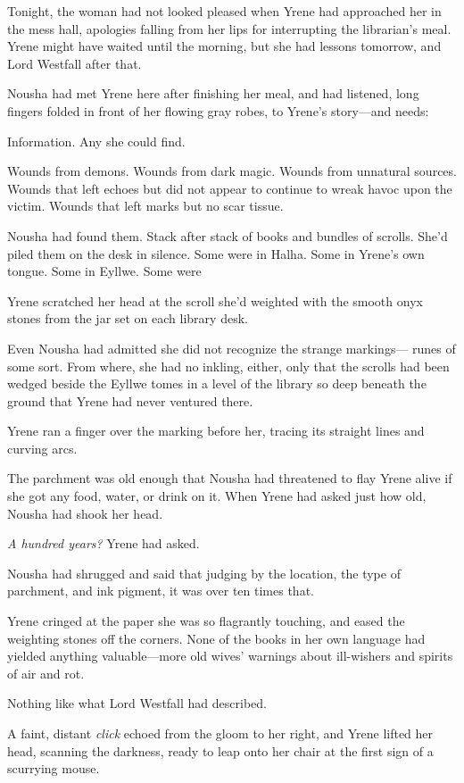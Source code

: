 Tonight, the woman had not looked pleased when Yrene had approached her in the mess hall, apologies falling from her lips for interrupting the librarian's meal.
Yrene might have waited until the morning, but she had lessons tomorrow, and Lord Westfall after that.

Nousha had met Yrene here after finishing her meal, and had listened, long fingers folded in front of her flowing gray robes, to Yrene's story---and needs:

Information.
Any she could find.

Wounds from demons.
Wounds from dark magic.
Wounds from unnatural sources.
Wounds that left echoes but did not appear to continue to wreak havoc upon the victim.
Wounds that left marks but no scar tissue.

Nousha had found them.
Stack after stack of books and bundles of scrolls.
She'd piled them on the desk in silence.
Some were in Halha.
Some in Yrene's own tongue.
Some in Eyllwe.
Some were 

Yrene scratched her head at the scroll she'd weighted with the smooth onyx stones from the jar set on each library desk.

Even Nousha had admitted she did not recognize the strange markings--- runes of some sort.
From where, she had no inkling, either, only that the scrolls had been wedged beside the Eyllwe tomes in a level of the library so deep beneath the ground that Yrene had never ventured there.

Yrene ran a finger over the marking before her, tracing its straight lines and curving arcs.

The parchment was old enough that Nousha had threatened to flay Yrene alive if she got any food, water, or drink on it.
When Yrene had asked just how old, Nousha had shook her head.

\emph{A hundred years?} Yrene had asked.

Nousha had shrugged and said that judging by the location, the type of parchment, and ink pigment, it was over ten times that.

Yrene cringed at the paper she was so flagrantly touching, and eased the weighting stones off the corners.
None of the books in her own language had yielded anything valuable---more old wives' warnings about ill-wishers and spirits of air and rot.

Nothing like what Lord Westfall had described.

A faint, distant \emph{click} echoed from the gloom to her right, and Yrene lifted her head, scanning the darkness, ready to leap onto her chair at the first sign of a scurrying mouse.

